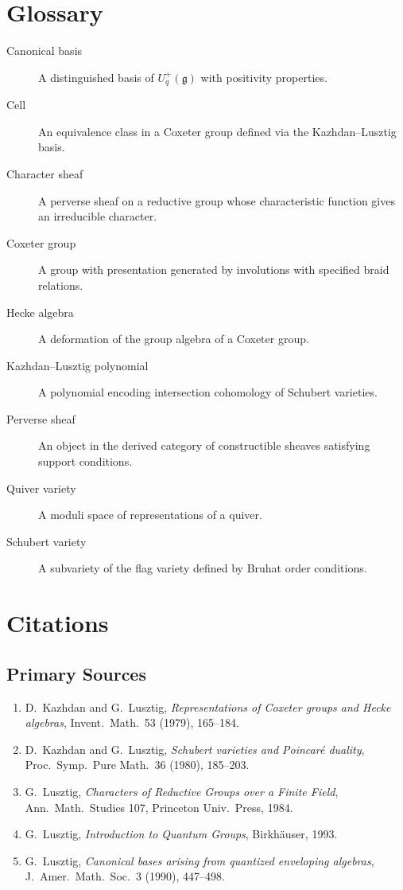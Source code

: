 \section*{Glossary}

\begin{description}
    \item[Canonical basis] A distinguished basis of $U_q^+(\mathfrak{g})$ with positivity properties.
    \item[Cell] An equivalence class in a Coxeter group defined via the Kazhdan--Lusztig basis.
    \item[Character sheaf] A perverse sheaf on a reductive group whose characteristic function gives an irreducible character.
    \item[Coxeter group] A group with presentation generated by involutions with specified braid relations.
    \item[Hecke algebra] A deformation of the group algebra of a Coxeter group.
    \item[Kazhdan--Lusztig polynomial] A polynomial encoding intersection cohomology of Schubert varieties.
    \item[Perverse sheaf] An object in the derived category of constructible sheaves satisfying support conditions.
    \item[Quiver variety] A moduli space of representations of a quiver.
    \item[Schubert variety] A subvariety of the flag variety defined by Bruhat order conditions.
\end{description}

\section{Citations}\subsection*{Primary Sources}
\begin{enumerate}
    \item D.\ Kazhdan and G.\ Lusztig, \textit{Representations of Coxeter groups and Hecke algebras}, Invent.\ Math.\ 53 (1979), 165--184.
    \item D.\ Kazhdan and G.\ Lusztig, \textit{Schubert varieties and Poincar\'e duality}, Proc.\ Symp.\ Pure Math.\ 36 (1980), 185--203.
    \item G.\ Lusztig, \textit{Characters of Reductive Groups over a Finite Field}, Ann.\ Math.\ Studies 107, Princeton Univ.\ Press, 1984.
    \item G.\ Lusztig, \textit{Introduction to Quantum Groups}, Birkh\"auser, 1993.
    \item G.\ Lusztig, \textit{Canonical bases arising from quantized enveloping algebras}, J.\ Amer.\ Math.\ Soc.\ 3 (1990), 447--498.
\end{enumerate}

